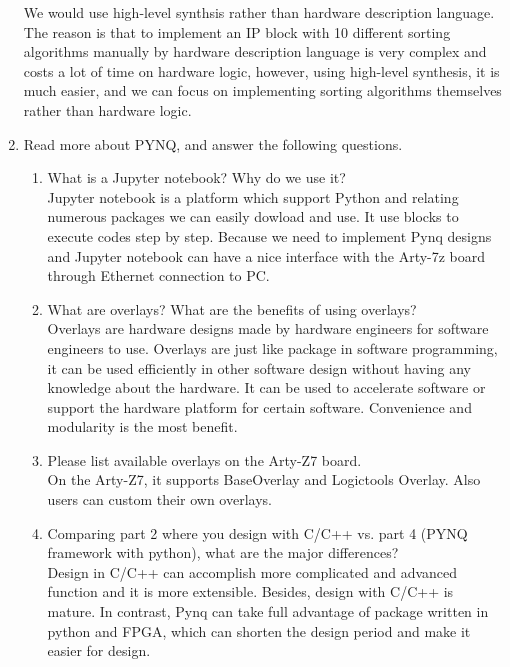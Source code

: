 \documentclass[a4paper]{article}
\begin{document}
\begin{enumerate}
    We would use high-level synthsis rather than hardware description language. The reason is that to implement an IP block with 10 different sorting algorithms manually by hardware description language is very complex and costs a lot of time on hardware logic, however, using high-level synthesis, it is much easier, and we can focus on implementing sorting algorithms themselves rather than hardware logic.
    \item Read more about PYNQ, and answer the following questions.
    \begin{enumerate}
    \item What is a Jupyter notebook? Why do we use it?\\
    Jupyter notebook is a platform which support Python and relating numerous packages we can easily dowload and use. It use blocks to execute codes step by step. Because we need to implement Pynq designs and Jupyter notebook can have a nice interface with the Arty-7z board through Ethernet connection to PC.
    \item What are overlays? What are the benefits of using overlays?\\
    Overlays are hardware designs made by hardware engineers for software engineers to use. Overlays are just like package in software programming, it can be used efficiently in other software design without having any knowledge about the hardware. It can be used to accelerate software or support the hardware platform for certain software. Convenience and modularity is the most benefit.
    \item Please list available overlays on the Arty-Z7 board.\\
    On the Arty-Z7, it supports BaseOverlay and Logictools Overlay. Also users can custom their own overlays.
    \item Comparing part 2 where you design with C/C++ vs. part 4 (PYNQ framework with python), what are the major differences?\\
    Design in C/C++ can accomplish more complicated and advanced function and it is more extensible. Besides, design with C/C++ is mature. In contrast, Pynq can take full advantage of package written in python and FPGA, which can shorten the design period and make it easier for design.
    \end{enumerate}
\end{enumerate}
\end{document}
